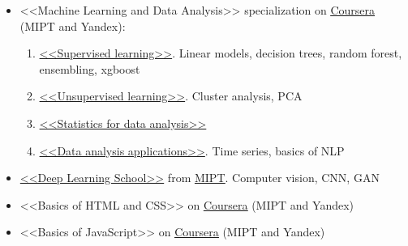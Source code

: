
\begin{itemize}
\item <<Machine Learning and Data Analysis>> specialization on \href{https://www.coursera.org/specializations/machine-learning-data-analysis?}{\underline{Coursera}} (MIPT and Yandex):
\begin{enumerate}
	\item \href{https://www.coursera.org/learn/supervised-learning?specialization=machine-learning-data-analysis}{<<Supervised learning>>}. Linear models, decision trees, random forest, ensembling, xgboost
	\item \href{https://www.coursera.org/learn/unsupervised-learning?specialization=machine-learning-data-analysis}{<<Unsupervised learning>>}. Cluster analysis, PCA
	\item \href{https://www.coursera.org/learn/stats-for-data-analysis/}{<<Statistics for data analysis>>}
	\item \href{https://www.coursera.org/learn/data-analysis-applications/}{<<Data analysis applications>>}. Time series, basics of NLP
\end{enumerate}


\divider
\item \href{https://en.dlschool.org/}{<<Deep Learning School>>} from \href{https::/mipt.ru/en}{\underline{MIPT}}. Computer vision, CNN, GAN
\item <<Basics of HTML and CSS>> on \href{https://www.coursera.org/learn/snovy-html-i-css?specialization=razrabotka-interfeysov}{\underline{Coursera}} (MIPT and Yandex)
\item <<Basics of JavaScript>> on \href{https://www.coursera.org/learn/javascript-osnovy-i-funktsii}{\underline{Coursera}} (MIPT and Yandex)

\end{itemize}



